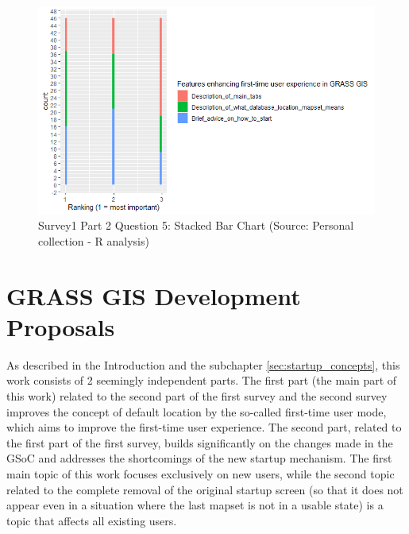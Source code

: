 \documentclass[a4paper,10pt,twoside]{article}
\begin{document}
\vspace{0.3cm}
\begin{figure}[hbt!] 
\begin{center}
\includegraphics[width=15cm]{../surveys/analyzed_data/survey1_part2_question5_histogram_r.png} 
\caption[Survey1 Part 2 Question 5: Stacked Bar Chart]{Survey1 Part 2 Question 5: Stacked Bar Chart (Source: Personal collection - R analysis)}
\label{fig:survey1_part2_question5_histogram_r}
\end{center}
\end{figure}

\newpage
\vspace*{-1cm}
\section{GRASS GIS Development Proposals}
\label{sec:proposal}

\noindent As described in the Introduction and the subchapter \ref{sec:startup_concepts}, this work consists of 2 seemingly independent parts. The first part (the main part of this work) related to the second part of the first survey and the second survey improves the concept of default location by the so-called first-time user mode, which aims to improve the first-time user experience. The second part, related to the first part of the first survey, builds significantly on the changes made in the GSoC and addresses the shortcomings of the new startup mechanism. The first main topic of this work focuses exclusively on new users, while the second topic related to the complete removal of the original startup screen (so that it does not appear even in a situation where the last mapset is not in a usable state) is a topic that affects all existing users.
\end{document}
